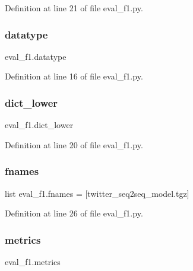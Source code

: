 Definition at line 21 of file eval\+\_\+f1.\+py.

\mbox{\label{namespaceeval__f1_a4b54b4e79cfc57c5d57afb5395959159}} 
\subsubsection{\texorpdfstring{datatype}{datatype}}
{\footnotesize\ttfamily eval\+\_\+f1.\+datatype}



Definition at line 16 of file eval\+\_\+f1.\+py.

\mbox{\label{namespaceeval__f1_a567ff0916073051faca8f1bb6bcc20ca}} 
\subsubsection{\texorpdfstring{dict\+\_\+lower}{dict\_lower}}
{\footnotesize\ttfamily eval\+\_\+f1.\+dict\+\_\+lower}



Definition at line 20 of file eval\+\_\+f1.\+py.

\mbox{\label{namespaceeval__f1_a27a5e82cbc3839ff9ea58baf5fb9c589}} 
\subsubsection{\texorpdfstring{fnames}{fnames}}
{\footnotesize\ttfamily list eval\+\_\+f1.\+fnames = \mbox{[}\textquotesingle{}twitter\+\_\+seq2seq\+\_\+model.\+tgz\textquotesingle{}\mbox{]}}



Definition at line 26 of file eval\+\_\+f1.\+py.

\mbox{\label{namespaceeval__f1_adeaf328bb2995785d55bd5db609c696c}} 
\subsubsection{\texorpdfstring{metrics}{metrics}}
{\footnotesize\ttfamily eval\+\_\+f1.\+metrics}



